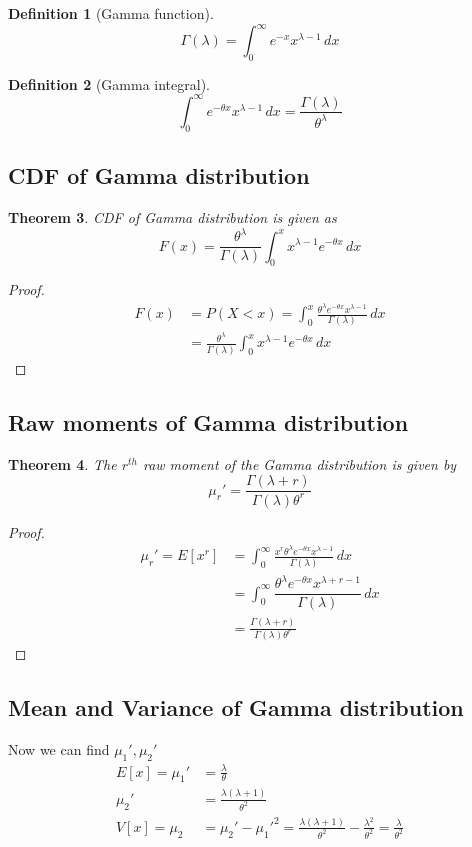 \documentclass[oneside,11pt,pdftex]{book}%
\numberwithin{equation}{section}
\newtheorem{theorem}{Theorem}[chapter]%
\newtheorem{definition}[theorem]{Definition}
\numberwithin{section}{chapter}
\numberwithin{equation}{chapter}
\begin{document}
\begin{definition}[Gamma function]
	\[ \Gamma(\lambda) =\int_0^\infty e^{-x} x^{\lambda -1 }\, dx \]
\end{definition}

\begin{definition}[Gamma integral]
	\[ \int_0^\infty e^{- \theta x} x^{\lambda -1}\, dx = \frac{\Gamma (\lambda)}{\theta^\lambda}\]
\end{definition}

\subsection{CDF of Gamma distribution}
\begin{theorem}
 	CDF of Gamma distribution is given as \[ F(x) = \frac{\theta^{\lambda}}{\Gamma(\lambda)} \int_0^x x^{\lambda-1} e^{-\theta x}\, dx\]
\end{theorem}
\begin{proof}
	\begin{align*}
		F(x)&=P(X<x)=\int_0^x \frac{\theta ^\lambda e^{- \theta x} x^{\lambda -1}}{\Gamma (\lambda )}\, dx\\
		&=\frac{\theta^{\lambda}}{\Gamma(\lambda)} \int_0^x x^{\lambda-1} e^{-\theta x}\, dx
		\end{align*}
\end{proof}

\subsection{Raw moments of Gamma distribution}
\begin{theorem}
	The $ r^{th} $ raw moment of the Gamma distribution is given by \[\mu_r'=\frac{\Gamma(\lambda+r)}{\Gamma(\lambda)\theta^r} \]
\end{theorem}
\begin{proof}
	\begin{align*}
		\mu_r'=E[x^r]&=\int_0^\infty \frac{x^r \theta^\lambda e^{-\theta x} x^{\lambda -1}}{\Gamma(\lambda)}\, dx\\
		&=\int_0^{\infty} \dfrac{\theta^{\lambda} e^{-\theta x}x^{\lambda+r-1}  }{\Gamma(\lambda)}\, dx\\
		&= \frac{\Gamma(\lambda+r)}{\Gamma(\lambda) \theta^r}
	\end{align*}
\end{proof}

\subsection{Mean and Variance of Gamma distribution}
Now we can find $ \mu_1', \mu_2' $
\begin{align*}
	E[x]= \mu_1'&=\frac{\lambda}{\theta}\\
	\mu_2'&= \frac{\lambda(\lambda+1)}{\theta^2}\\
	V[x] = \mu_2 &=\mu_2'-\mu_1'^2=\frac{\lambda(\lambda +1)}{\theta^2}-\frac{\lambda^2}{\theta^2}=\frac{\lambda}{\theta^2}
\end{align*}
\end{document}
